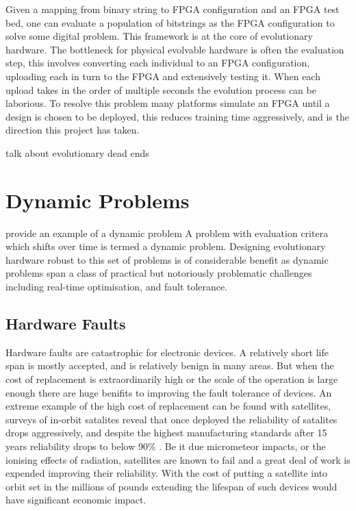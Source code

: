 Given a mapping from binary string to FPGA configuration and an FPGA test bed, one can
evaluate a population of bitstrings as the FPGA configuration to solve some digital
problem. This framework is at the core of evolutionary hardware. The bottleneck for physical evolvable
hardware is often the evaluation step, this involves converting each individual
to an FPGA configuration, uploading each in turn
to the FPGA and extensively testing it. When each upload takes in the order of
multiple seconds the evolution process can be laborious. To resolve this problem
many platforms simulate an FPGA until a design is chosen to be deployed, this reduces
training time aggressively, and is the direction this project has taken.

\todo talk about evolutionary dead ends

\section{Dynamic Problems}

\todo provide an example of a dynamic problem
A problem with evaluation critera which shifts over time is termed a dynamic problem. Designing
evolutionary hardware robust to this set of problems is of considerable benefit as
dynamic problems span a class of practical but notoriously problematic challenges including
real-time optimisation, and fault tolerance.

\subsection{Hardware Faults}
Hardware faults are catastrophic for electronic devices. A relatively short life span is
mostly accepted, and is relatively benign in many areas. But when the cost of replacement is
extraordinarily high or the scale of the operation is large enough there are huge benifits
to improving the fault tolerance of devices. An extreme example of the high cost of replacement
can be found with satellites, surveys of in-orbit satalites reveal that once deployed the
reliability of satalites drops aggressively, and despite the highest manufacturing standards
after 15 years reliability drops to below
90\% \cite{CASTET20091718}. Be it due micrometeor impacts,
or the ionising effects of radiation, satellites are known to fail and a great deal of
work is expended improving their reliability. With the cost
of putting a satellite into orbit set in the millions of pounds extending the lifespan
of such devices would have significant economic impact.

